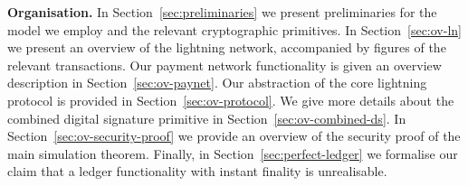 \noindent \textbf{Organisation.} In Section~\ref{sec:preliminaries} we present
preliminaries for the model we employ and the relevant cryptographic primitives.
In Section~\ref{sec:ov-ln} we present an overview of the lightning network,
accompanied by figures of the relevant transactions. Our payment network
functionality is given an overview description in Section~\ref{sec:ov-paynet}.
Our abstraction of the core lightning protocol is provided in
Section~\ref{sec:ov-protocol}. We give more details about the combined digital
signature primitive in Section~\ref{sec:ov-combined-ds}. In
Section~\ref{sec:ov-security-proof} we provide an overview of the security
proof of the main simulation theorem. Finally, in
Section~\ref{sec:perfect-ledger} we formalise our claim that a ledger
functionality with instant finality is unrealisable. 

